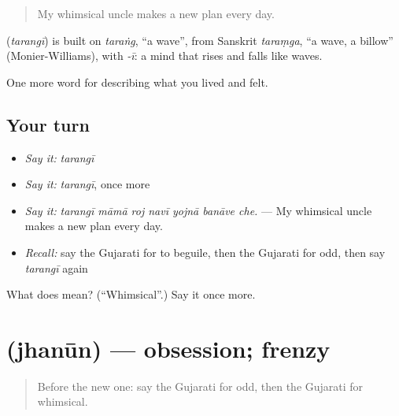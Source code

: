 \begin{quote}
My whimsical uncle makes a new plan every day.
\end{quote}

\begin{cousinweb}
\textbf{} (\emph{tarangī}) is built on \emph{taraṅg}, \textquotedblleft{}a wave\textquotedblright{}, from Sanskrit \emph{taraṃga}, \textquotedblleft{}a wave, a billow\textquotedblright{} (Monier-Williams), with \emph{-ī}: a mind that rises and falls like waves.
\end{cousinweb}

\begin{grammarlens}[title={What you've built}]
One more word for describing what you lived and felt.
\end{grammarlens}

\subsection*{Your turn}
\begin{itemize}
\raggedright
  \item \emph{Say it:} \emph{tarangī}
  \item \emph{Say it:} \emph{tarangī}, once more
  \item \emph{Say it:} \emph{tarangī māmā roj navī yojnā banāve che.} — My whimsical uncle makes a new plan every day.
  \item \emph{Recall:} say the Gujarati for to beguile, then the Gujarati for odd, then say \emph{tarangī} again
\end{itemize}

\begin{tcolorbox}[breakable,colback=teal!4,colframe=teal!35!black,title={Before you move on}]
What does  mean? (\textquotedblleft{}Whimsical\textquotedblright{}.) Say it once more.
\end{tcolorbox}
\section[\texorpdfstring{\gu{ઝનૂન} (jhanūn)}{ઝનૂન (jhanūn)}]{ (jhanūn) — obsession; frenzy}

\label{lesson:GU-C469-jhanun}



\begin{quote}
Before the new one: say the Gujarati for odd, then the Gujarati for whimsical.
\end{quote}


